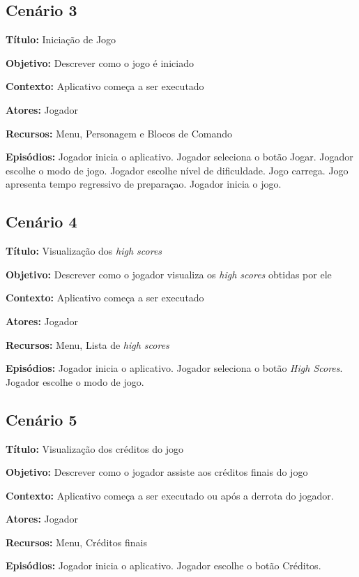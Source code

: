 \subsection{Cenário 3}

\textbf{Título:} Iniciação de Jogo

\textbf{Objetivo:} Descrever como o jogo é iniciado

\textbf{Contexto:} Aplicativo começa a ser executado 

\textbf{Atores:} Jogador

\textbf{Recursos:} Menu, Personagem e Blocos de Comando

\textbf{Episódios:} Jogador inicia o aplicativo. Jogador seleciona o botão Jogar. Jogador escolhe o modo de jogo. Jogador escolhe nível de dificuldade. Jogo carrega. Jogo apresenta tempo regressivo de preparaçao. Jogador inicia o jogo.

\subsection{Cenário 4}

\textbf{Título:} Visualização dos \textit{high scores}

\textbf{Objetivo:} Descrever como o jogador visualiza os \textit{high scores} obtidas por ele

\textbf{Contexto:} Aplicativo começa a ser executado

\textbf{Atores:} Jogador

\textbf{Recursos:} Menu, Lista de \textit{high scores}

\textbf{Episódios:} Jogador inicia o aplicativo. Jogador seleciona o botão \textit{High Scores}. Jogador escolhe o modo de jogo.

\subsection{Cenário 5}

\textbf{Título:} Visualização dos créditos do jogo

\textbf{Objetivo:} Descrever como o jogador assiste aos créditos finais do jogo

\textbf{Contexto:} Aplicativo começa a ser executado ou após a derrota do jogador.

\textbf{Atores:} Jogador

\textbf{Recursos:} Menu, Créditos finais

\textbf{Episódios:} Jogador inicia o aplicativo. Jogador escolhe o botão Créditos.


